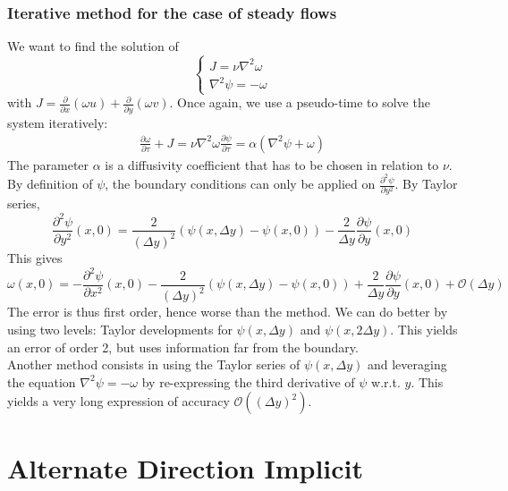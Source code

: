 \documentclass[12pt, openany]{report}
\theoremstyle{definition}
\begin{document}
\subsection{Iterative method for the case of steady flows}
We want to find the solution of 
\begin{equation}
	\begin{cases}
		J = \nu \nabla^2 \omega \\
		\nabla^2 \psi = -\omega
	\end{cases}
\end{equation}
with $J=\frac{\partial }{\partial x}(\omega u) + \frac{\partial}{\partial y}(\omega v)$. Once again, we use a pseudo-time to solve the system iteratively:
\begin{equation}
	\begin{aligned}
		\frac{\partial \omega}{\partial \tau} + J = \nu \nabla^2 \omega 
		\frac{\partial \psi}{\partial \tau} = \alpha (\nabla^2 \psi + \omega)
	\end{aligned}
\end{equation}
The parameter $\alpha$ is a diffusivity coefficient that has to be chosen in relation to $\nu$. \\

By definition of $\psi$, the boundary conditions can only be applied on $\frac{\partial^2 \psi}{\partial y^2}$. By Taylor series,
\begin{equation}
	\frac{\partial^2\psi}{\partial y^2}(x,0) = \frac{2}{(\Delta y)^2} \left(\psi(x,\Delta y)-\psi(x,0)\right) - \frac{2}{\Delta y} \frac{\partial \psi}{\partial y}(x,0)
\end{equation}
This gives 
\begin{equation}
	\omega(x,0) = -\frac{\partial^2 \psi}{\partial x^2}(x,0) - \frac{2}{(\Delta y)^2}(\psi(x,\Delta y)-\psi(x,0)) + \frac{2}{\Delta y}\frac{\partial \psi}{\partial y}(x,0) + \mathcal{O}(\Delta y)
\end{equation}
The error is thus first order, hence worse than the method. We can do better by using two levels: Taylor developments for $\psi(x,\Delta y)$ and $\psi(x, 2\Delta y)$. This yields an error of order 2, but uses information far from the boundary. \\
Another method consists in using the Taylor series of $\psi(x,\Delta y)$ and leveraging the equation $\nabla^2 \psi = -\omega$ by re-expressing the third derivative of $\psi$ w.r.t. $y$. This yields a very long expression of accuracy $\mathcal{O}((\Delta y)^2)$. 
\chapter{Alternate Direction Implicit}
\end{document}
